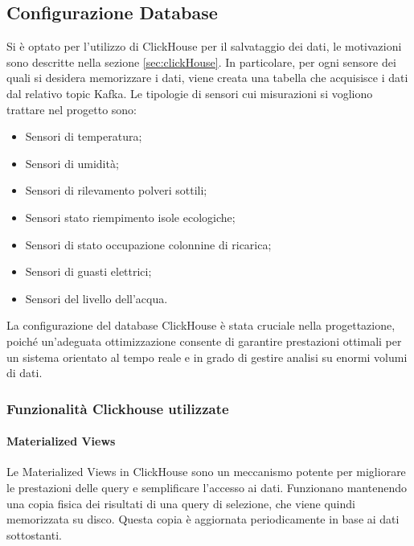 \subsection{Configurazione Database}
Si è optato per l'utilizzo di ClickHouse per il salvataggio dei dati, le motivazioni sono descritte nella sezione \ref{sec:clickHouse}. In particolare, per ogni sensore dei quali si desidera memorizzare i dati, viene creata una tabella che acquisisce i dati dal relativo topic Kafka.
Le tipologie di sensori cui misurazioni si vogliono trattare nel progetto sono:
\begin{itemize}
    \item Sensori di temperatura;
    \item Sensori di umidità;
    \item Sensori di rilevamento polveri sottili; 
    \item Sensori stato riempimento isole ecologiche;
    \item Sensori di stato occupazione colonnine di ricarica;
    \item Sensori di guasti elettrici;
    \item Sensori del livello dell'acqua.
\end{itemize}

La configurazione del database ClickHouse è stata cruciale nella progettazione, poiché un'adeguata ottimizzazione consente di garantire prestazioni ottimali per un sistema orientato al tempo reale e in grado di gestire analisi su enormi volumi di dati.


\subsubsection{Funzionalità Clickhouse utilizzate}
\paragraph{Materialized Views}
Le Materialized Views in ClickHouse sono un meccanismo potente per migliorare le prestazioni delle query e semplificare l'accesso ai dati. Funzionano mantenendo una copia fisica dei risultati di una query di selezione, che viene quindi memorizzata su disco. Questa copia è aggiornata periodicamente in base ai dati sottostanti.

